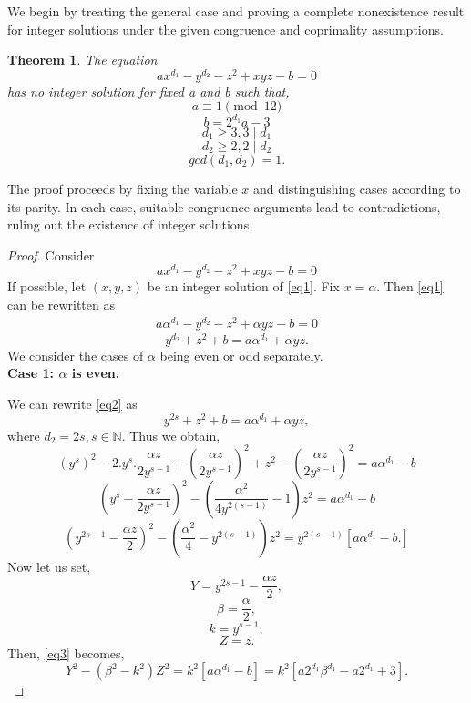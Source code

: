 \documentclass[12pt, reqno]{amsart}
\newtheorem{thm}{Theorem}[section]
\numberwithin{equation}{section}
\theoremstyle{definition}
\theoremstyle{nodefstyle}
\def\N{\mathbb{N}}
\begin{document}
We begin by treating the general case and proving a complete nonexistence result for
integer solutions under the given congruence and coprimality assumptions.
\begin{thm}
The equation 
\[ax^{d_1}-y^{d_2}-z^2+xyz-b=0\] has no integer solution for fixed a and b such that,
\[a\equiv 1 \pmod {12}\]
\[b=2^{d_1}a-3\]
\[d_1 \geq 3 , 3\mid {d_1}\]
\[d_2 \geq 2, 2\mid {d_2}\]
\[gcd(d_1, d_2)=1.\]\label{th1}
\end{thm}
The proof proceeds by fixing the variable $x$ and distinguishing cases according to
its parity. In each case, suitable congruence arguments lead to contradictions, ruling
out the existence of integer solutions.
\begin{proof}
Consider
\begin{equation}
    ax^{d_1}-y^{d_2}-z^2+xyz-b=0 \label{eq1}
\end{equation}
If possible, let $(x,y,z)$ be an integer solution of \eqref{eq1}. Fix $x=\alpha$. Then \eqref{eq1}  can be rewritten as 
\begin{align*}
 a\alpha^{d_1}-y^{d_2}-z^2+\alpha yz-b=0    
\end{align*}
\begin{equation}
  y^{d_2}+z^2+b=a\alpha^{d_1}+\alpha yz.  \label{eq2} 
\end{equation}
\vspace{2mm}
We consider the cases of $\alpha$ being even or odd separately. \\
\vspace{2mm}
\textbf{Case 1: $\alpha$ is even.}

We can rewrite \eqref{eq2} as
$$y^{2s}+z^2+b=a\alpha^{d_1}+\alpha yz,$$  where $d_2=2s,s\in\N$. Thus we obtain,
\[ (y^s)^2-2.y^s.\frac{\alpha z}{2y^{s-1}}+\left( \frac{\alpha z}{2y^{s-1}} \right)^2+z^2-\left( \frac{\alpha z}{2y^{s-1}} \right)^2=a\alpha ^{d_1}-b\]
\[\left( y^s-\frac{\alpha z}{2y^{s-1}}\right)^2-\left( \frac{\alpha ^2}{4y^{2(s-1)}}-1\right)z^2=a\alpha ^{d_1}-b\]
\begin{equation}
\left( y^{2s-1}-\frac{\alpha z}{2}\right)^2-\left( \frac{\alpha ^2}{4}-y^{2(s-1)}\right)z^2=y^{2(s-1)}[ a\alpha ^{d_1}-b.] \label{eq3}   
\end{equation}
Now let us set,
\begin{equation*}
    Y= y^{2s-1}-\frac{\alpha z}{2},
    \end{equation*}
    \begin{equation*}
        \beta= \frac{\alpha}{2},
    \end{equation*}
    \begin{equation*}
        k=y^{s-1},
    \end{equation*}
    \begin{equation*}
        Z=z.
    \end{equation*}
    Then, \eqref{eq3} becomes,
\begin{equation}    
Y^2-\left(\beta ^2-k^2\right )Z^2=k^2\left[a\alpha ^{d_1}-b\right] =k^2\left[a2^{d_1}\beta ^{d_1}-a2^{d_1}+3\right]. \label{eq4}
\end{equation}


\end{proof}
\end{document}
